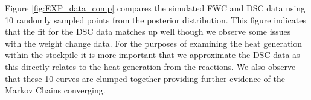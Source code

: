 Figure \ref{fig:EXP_data_comp} compares the simulated FWC and DSC data using 10 randomly sampled points from the posterior distribution. This figure indicates that the fit for the DSC data matches up well though we observe some issues with the weight change data. For the purposes of examining the heat generation within the stockpile it is more important that we approximate the DSC data as this directly relates to the heat generation from the reactions. We also observe that these 10 curves are clumped together providing further evidence of the Markov Chains converging.

